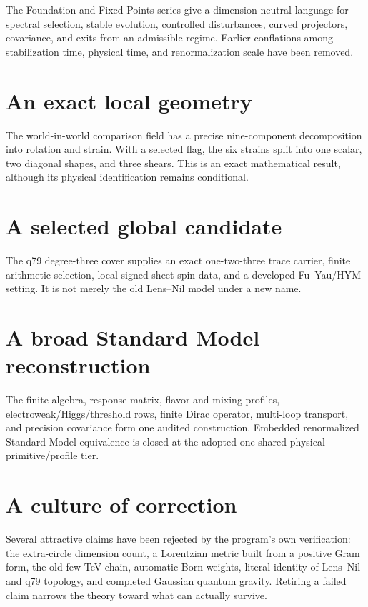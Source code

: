 \documentclass[11pt,openany]{book}
\begin{document}
The Foundation and Fixed Points series give a dimension-neutral language for
spectral selection, stable evolution, controlled disturbances, curved
projectors, covariance, and exits from an admissible regime. Earlier
conflations among stabilization time, physical time, and renormalization
scale have been removed.

\section*{An exact local geometry}

The world-in-world comparison field has a precise nine-component
decomposition into rotation and strain. With a selected flag, the six strains
split into one scalar, two diagonal shapes, and three shears. This is an exact
mathematical result, although its physical identification remains
conditional.

\section*{A selected global candidate}

The q79 degree-three cover supplies an exact one-two-three trace carrier,
finite arithmetic selection, local signed-sheet spin data, and a developed
Fu--Yau/HYM setting. It is not merely the old Lens--Nil model under a new
name.

\section*{A broad Standard Model reconstruction}

The finite algebra, response matrix, flavor and mixing profiles,
electroweak/Higgs/threshold rows, finite Dirac operator, multi-loop transport,
and precision covariance form one audited construction. Embedded
renormalized Standard Model equivalence is closed at the adopted
one-shared-physical-primitive/profile tier.

\section*{A culture of correction}

Several attractive claims have been rejected by the program's own
verification: the extra-circle dimension count, a Lorentzian metric built
from a positive Gram form, the old few-TeV chain, automatic Born weights,
literal identity of Lens--Nil and q79 topology, and completed Gaussian
quantum gravity. Retiring a failed claim narrows the theory toward what can
actually survive.
\end{document}

